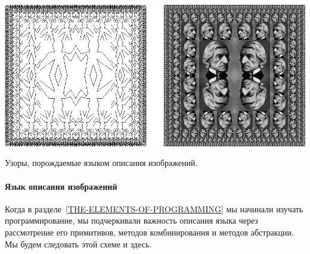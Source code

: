 \begin{cntrfig}
\includegraphics{xfig-mod/2-9.eps}
\caption{Узоры, порождаемые языком описания
изображений.}
\label{P2.9}

\end{cntrfig}

\paragraph{Язык описания изображений}


Когда в разделе~\ref{THE-ELEMENTS-OF-PROGRAMMING} мы начинали изучать 
программирование, мы подчеркивали важность описания языка через
рассмотрение его примитивов, методов комбинирования и методов
абстракции.  Мы будем следовать этой схеме и здесь.

